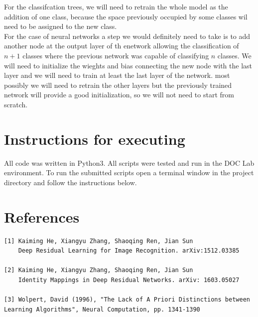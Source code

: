 \documentclass[12pt,twoside]{article}
\begin{document}
For the classifcation trees, we will need to retrain the whole model as the addition of one class, because the space previously occupied by some classes wil need to be assigned to the new class.\\

For the case of neural networks a step we would definitely need to take is to add another node at the output layer of th enetwork allowing the classification of $n+1$ classes where the previous network was capable of classifying $n$ classes. We will need to initialize the wieghts and bias connecting the new node with the last layer and we will need to train at least the last layer of the network. most possibly we will need to retrain the other layers but the previously trained network will provide a good initialization, so we will not need to start from scratch.


\newpage
\section{Instructions for executing}
All code was written in Python3. All scripts were tested and run in the DOC Lab environment. To run the submitted scripts open a terminal window in the project directory and follow the instructions below.\\

\newpage
\section{References}

\begin{verbatim}
[1] Kaiming He, Xiangyu Zhang, Shaoqing Ren, Jian Sun
    Deep Residual Learning for Image Recognition. arXiv:1512.03385

[2] Kaiming He, Xiangyu Zhang, Shaoqing Ren, Jian Sun
    Identity Mappings in Deep Residual Networks. arXiv: 1603.05027
    
[3] Wolpert, David (1996), "The Lack of A Priori Distinctions between Learning Algorithms", Neural Computation, pp. 1341-1390
\end{verbatim}
\end{document}
